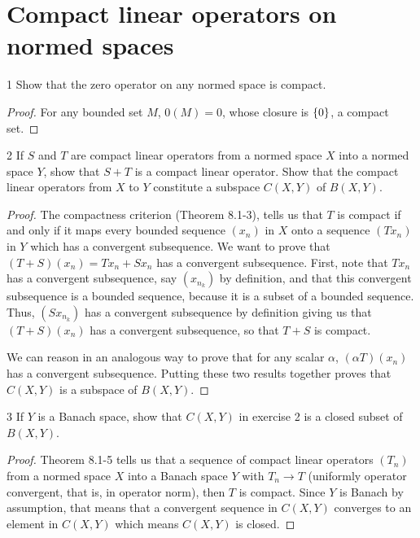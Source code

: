 \section{Compact linear operators on normed spaces}


\begin{exercise}{1}
Show that the zero operator on any normed space is compact.
\end{exercise}
\begin{proof}
For any bounded set $M$, $0(M) = 0$, whose closure is $\{0\}$, a compact set.
\end{proof} 

\begin{exercise}{2}
If $S$ and $T$ are compact linear operators from a normed space $X$ into a normed space $Y$, show that $S + T$ is a compact linear operator.
Show that the compact linear operators from $X$ to $Y$ constitute a subspace $C(X, Y)$ of $B(X, Y)$.
\end{exercise}
\begin{proof}
The compactness criterion (Theorem 8.1-3), tells us that $T$ is compact if and only if it maps every bounded sequence $(x_n)$ in $X$ onto a sequence $(T x_n)$ in $Y$ which has a convergent subsequence.
We want to prove that $(T + S)(x_n) = T x_n + S x_n$ has a convergent subsequence.
First, note that $T x_n$ has a convergent subsequence, say $(x_{n_k})$ by definition, and that this convergent subsequence is a bounded sequence, because it is a subset of a bounded sequence.
Thus, $(S x_{n_k})$ has a convergent subsequence by definition giving us that $(T + S)(x_n)$ has a convergent subsequence, so that $T + S$ is compact.

We can reason in an analogous way to prove that for any scalar $\alpha$, $(\alpha T)(x_n)$ has a convergent subsequence.
Putting these two results together proves that $C(X, Y)$ is a subspace of $B(X, Y)$.
\end{proof} 

\begin{exercise}{3}
If $Y$ is a Banach space, show that $C(X, Y)$ in exercise 2 is a closed subset of $B(X, Y)$.
\end{exercise}
\begin{proof}
Theorem 8.1-5 tells us that a sequence of compact linear operators $(T_n)$ from a normed space $X$ into a Banach space $Y$ with $T_n \to T$ (uniformly operator convergent, that is, in operator norm), then $T$ is compact.
Since $Y$ is Banach by assumption, that means that a convergent sequence in $C(X, Y)$ converges to an element in $C(X, Y)$ which means $C(X, Y)$ is closed.
\end{proof} 

